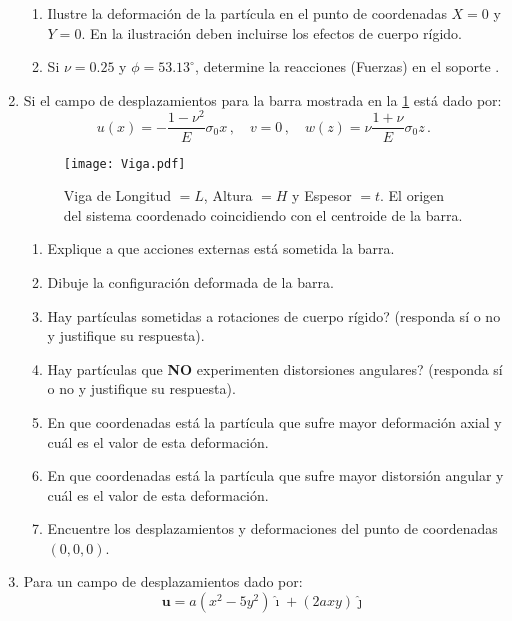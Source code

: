 \documentclass[../notas medios.tex]{subfiles}
\begin{document}
\begin{enumerate}
\begin{enumerate}
\item Ilustre la deformación de la partícula en el punto de coordenadas $X 
= 0$ y $Y = 0$. En la ilustración deben incluirse los efectos de cuerpo 
rígido. 	

\item Si $\nu=0.25$ y $\phi=53.13^{\circ}$, determine la reacciones (Fuerzas) 
en el soporte .
\end{enumerate}

\item  \label{punto10_d} Si el campo de desplazamientos para la barra mostrada 
en la \ref{def:Mario} está dado por:
\[u\left( x \right) = -\dfrac{1-\nu^2}{E} \sigma_0 x\, ,\quad v=0\, ,\quad 
w\left( z \right) = \nu \dfrac{1+\nu}{E} \sigma_0 z\, .\]
\begin{figure}[H]
	\centering
	\texttt{[image: Viga.pdf]} 
	\caption{Viga de Longitud $= L$, Altura $=H$ y Espesor $=t$. El origen del sistema coordenado coincidiendo con el centroide de la barra.}
	\label{def:Mario}
\end{figure}

\begin{enumerate}
\item Explique a que acciones externas está sometida la barra.

\item Dibuje la configuración deformada de la barra.

\item \textquestiondown Hay partículas sometidas a rotaciones de cuerpo 
rígido? (responda sí o no y justifique su respuesta).

\item \textquestiondown Hay partículas que {\textbf{NO}} experimenten 
distorsiones angulares? (responda sí o no y justifique su respuesta).

\item En que coordenadas está la partícula que sufre mayor deformación 
axial y cuál es el valor de esta deformación.

\item En que coordenadas está la partícula que sufre mayor distorsión 
angular y cuál es el valor de esta deformación.

\item Encuentre los desplazamientos y deformaciones del punto de 
coordenadas $(0,0,0)$.
\end{enumerate}

%
\item   \label{punto11_d} Para un campo de desplazamientos dado por:
\[\mathbf{u} = a(x^2 - 5y^2)\hat{\imath} + (2ax y)\hat{\jmath} \]


\end{enumerate}
\end{document}
